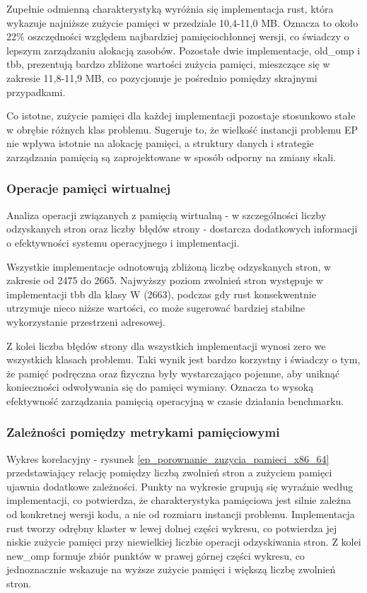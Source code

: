 Zupełnie odmienną charakterystyką wyróżnia się implementacja rust, która wykazuje najniższe zużycie pamięci w przedziale 10,4-11,0 MB. Oznacza to około 22\% oszczędności względem najbardziej pamięciochłonnej wersji, co świadczy o lepszym zarządzaniu alokacją zasobów. Pozostałe dwie implementacje, old\_omp i tbb, prezentują bardzo zbliżone wartości zużycia pamięci, mieszczące się w zakresie 11,8-11,9 MB, co pozycjonuje je pośrednio pomiędzy skrajnymi przypadkami.

Co istotne, zużycie pamięci dla każdej implementacji pozostaje stosunkowo stałe w obrębie różnych klas problemu. Sugeruje to, że wielkość instancji problemu EP nie wpływa istotnie na alokację pamięci, a struktury danych i strategie zarządzania pamięcią są zaprojektowane w sposób odporny na zmiany skali.

\subsubsection{Operacje pamięci wirtualnej}
Analiza operacji związanych z pamięcią wirtualną - w szczególności liczby odzyskanych stron oraz liczby błędów strony - dostarcza dodatkowych informacji o efektywności systemu operacyjnego i implementacji.

Wszystkie implementacje odnotowują zbliżoną liczbę odzyskanych stron, w zakresie od 2475 do 2665. Najwyższy poziom zwolnień stron występuje w implementacji tbb dla klasy W (2663), podczas gdy rust konsekwentnie utrzymuje nieco niższe wartości, co może sugerować bardziej stabilne wykorzystanie przestrzeni adresowej.

Z kolei liczba błędów strony dla wszystkich implementacji wynosi zero we wszystkich klasach problemu. Taki wynik jest bardzo korzystny i świadczy o tym, że pamięć podręczna oraz fizyczna były wystarczająco pojemne, aby uniknąć konieczności odwoływania się do pamięci wymiany. Oznacza to wysoką efektywność zarządzania pamięcią operacyjną w czasie działania benchmarku.

\subsubsection{Zależności pomiędzy metrykami pamięciowymi}
Wykres korelacyjny - rysunek \ref{ep_porownanie_zuzycia_pamieci_x86_64} przedstawiający relację pomiędzy liczbą zwolnień stron a zużyciem pamięci ujawnia dodatkowe zależności. Punkty na wykresie grupują się wyraźnie według implementacji, co potwierdza, że charakterystyka pamięciowa jest silnie zależna od konkretnej wersji kodu, a nie od rozmiaru instancji problemu. Implementacja rust tworzy odrębny klaster w lewej dolnej części wykresu, co potwierdza jej niskie zużycie pamięci przy niewielkiej liczbie operacji odzyskiwania stron. Z kolei new\_omp formuje zbiór punktów w prawej górnej części wykresu, co jednoznacznie wskazuje na wyższe zużycie pamięci i większą liczbę zwolnień stron.

